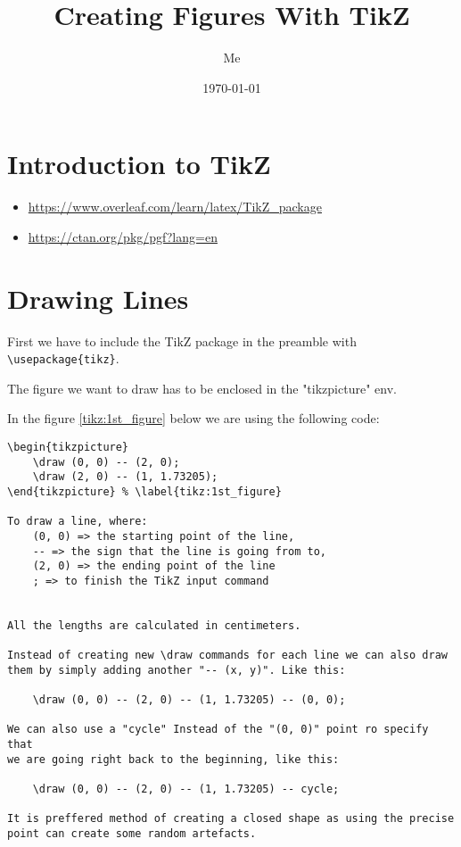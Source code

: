 \documentclass[12pt,titlepage]{article}
\title{Creating Figures With TikZ}
\author{Me}
\date{\today}
\begin{document}
\maketitle

\newpage
\thispagestyle{empty}
\tableofcontents
\newpage

\section{Introduction to TikZ}
\begin{itemize}
    \item \url{https://www.overleaf.com/learn/latex/TikZ_package}
    \item \url{https://ctan.org/pkg/pgf?lang=en}
\end{itemize}

\section{Drawing Lines}

First we have to include the TikZ package in the preamble with \verb|\usepackage{tikz}|.

The figure we want to draw has to be enclosed in the "tikzpicture" env.

In the figure \ref{tikz:1st_figure} below we are using the following code:
\begin{verbatim}
\begin{tikzpicture} 
    \draw (0, 0) -- (2, 0);
    \draw (2, 0) -- (1, 1.73205);
\end{tikzpicture} % \label{tikz:1st_figure}

To draw a line, where:
    (0, 0) => the starting point of the line,
    -- => the sign that the line is going from to,
    (2, 0) => the ending point of the line
    ; => to finish the TikZ input command
    

All the lengths are calculated in centimeters.

Instead of creating new \draw commands for each line we can also draw
them by simply adding another "-- (x, y)". Like this:

    \draw (0, 0) -- (2, 0) -- (1, 1.73205) -- (0, 0);

We can also use a "cycle" Instead of the "(0, 0)" point ro specify that
we are going right back to the beginning, like this:

    \draw (0, 0) -- (2, 0) -- (1, 1.73205) -- cycle;

It is preffered method of creating a closed shape as using the precise
point can create some random artefacts.
\end{verbatim}
\end{document}
